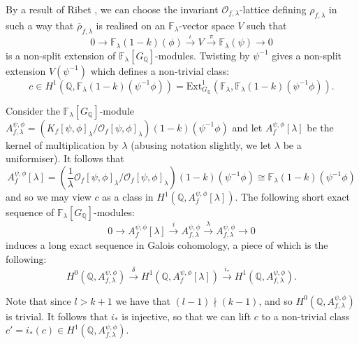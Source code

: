 \documentclass{amsart}
\theoremstyle{plain}
\theoremstyle{definition}
\begin{document}
By a result of Ribet \cite{ribet_1976}, we can choose the invariant $\mathcal{O}_{f,\lambda}$-lattice defining $\rho_{f,\lambda}$ in such a way that $\overline{\rho}_{f,\lambda}$ is realised on an $\mathbb{F}_{\lambda}$-vector space $V$ such that
\begin{equation*}
    0 \longrightarrow \mathbb{F}_\lambda(1-k)(\phi) \overset{\iota}\longrightarrow V \overset{\pi}\longrightarrow \mathbb{F}_\lambda(\psi) \longrightarrow 0
\end{equation*}
is a non-split extension of $\mathbb{F}_\lambda[G_{\mathbb{Q}}]$-modules. Twisting by $\psi^{-1}$ gives a non-split extension $V(\psi^{-1})$ which defines a non-trivial class: \[c\in H^1(\mathbb{Q},\mathbb{F}_{\lambda}(1-k)(\psi^{-1}\phi)) = \text{Ext}_{G_{\mathbb{Q}}}^1(\mathbb{F}_{\lambda},\mathbb{F}_{\lambda}(1-k)(\psi^{-1}\phi)).\]

Consider the $\mathbb{F}_\lambda[G_{\mathbb{Q}}]$-module $A_{f,\lambda}^{\psi,\phi}= (K_f[\psi,\phi]_{\lambda} / \mathcal{O}_f[\psi,\phi]_{\lambda})(1-k)(\psi^{-1}\phi)$ and let $A_f^{\psi,\phi}[\lambda]$ be the kernel of multiplication by $\lambda$ (abusing notation slightly, we let $\lambda$ be a uniformiser). It follows that \[A_f^{\psi,\phi}[\lambda] = \left(\frac{1}{\lambda}\mathcal{O}_f[\psi,\phi]_{\lambda}/\mathcal{O}_f[\psi,\phi]_{\lambda}\right)(1-k)(\psi^{-1}\phi)\cong \mathbb{F}_{\lambda}(1-k)(\psi^{-1}\phi)\] and so we may view $c$ as a class in $H^1(\mathbb{Q},A_f^{\psi,\phi}[\lambda])$. The following short exact sequence of $\mathbb{F}_{\lambda}[G_{\mathbb{Q}}]$-modules:
\begin{equation*}
    0 \longrightarrow A_f^{\psi,\phi}[\lambda] \overset{i}\longrightarrow A_{f,\lambda}^{\psi,\phi} \overset{\lambda}\longrightarrow A_{f,\lambda}^{\psi,\phi} \longrightarrow 0
\end{equation*}
induces a long exact sequence in Galois cohomology, a piece of which is the following:
\begin{equation*}
    H^0(\mathbb{Q}, A_{f,\lambda}^{\psi,\phi}) \overset{\delta}\longrightarrow H^1(\mathbb{Q}, A_f^{\psi,\phi}[\lambda]) \overset{i_*}\longrightarrow H^1(\mathbb{Q}, A_{f,\lambda}^{\psi,\phi}).
\end{equation*}

\noindent Note that since $l> k+1$ we have that $(l-1)\nmid (k-1)$, and so $H^0(\mathbb{Q}, A_{f,\lambda}^{\psi,\phi})$ is trivial. It follows that $i_*$ is injective, so that we can lift $c$ to a non-trivial class $c' = i_*(c) \in H^1(\mathbb{Q}, A_{f,\lambda}^{\psi,\phi})$.
\end{document}
